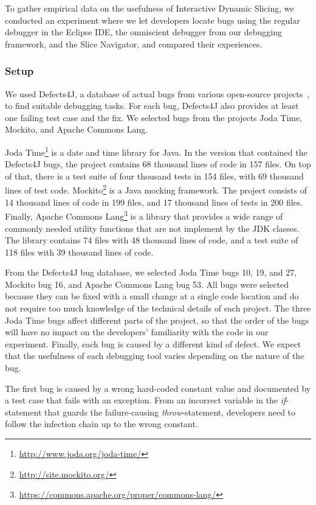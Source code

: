 \documentclass[
			english,
			]{elsarticle}
\begin{document}
To gather empirical data on the usefulness of Interactive Dynamic Slicing, we conducted an experiment where we let developers locate bugs using the regular debugger in the Eclipse IDE, the omniscient debugger from our debugging framework, and the Slice Navigator, and compared their experiences.

\subsubsection{Setup}

We used Defects4J, a database of actual bugs from various open-source projects~\cite{just_defects4j_2014}, to find suitable debugging tasks.
For each bug, Defects4J also provides at least one failing test case and the fix.
We selected bugs from the projects Joda Time, Mockito, and Apache Commons Lang.

Joda Time\footnote{\url{http://www.joda.org/joda-time/}} is a date and time library for Java.
In the version that contained the Defects4J bugs, the project contains 68 thousand lines of code in 157 files.
On top of that, there is a test suite of four thousand tests in 154 files, with 69 thousand lines of test code.
Mockito\footnote{\url{http://site.mockito.org/}} is a Java mocking framework.
The project consists of 14 thousand lines of code in 199 files, and 17 thousand lines of tests in 200 files.
Finally, Apache Commons Lang\footnote{\url{https://commons.apache.org/proper/commons-lang/}} is a library that provides a wide range of commonly needed utility functions that are not implement by the JDK classes.
The library contains 74 files with 48 thousand lines of code, and a test suite of 118 files with 39 thousand lines of code.



From the Defects4J bug database, we selected Joda Time bugs 10, 19, and 27, Mockito bug 16, and Apache Commons Lang bug 53.
All bugs were selected because they can be fixed with a small change at a single code location and do not require too much knowledge of the technical details of each project.
The three Joda Time bugs affect different parts of the project, so that the order of the bugs will have no impact on the developers' familiarity with the code in our experiment.
Finally, each bug is caused by a different kind of defect.
We expect that the usefulness of each debugging tool varies depending on the nature of the bug.

The first bug is caused by a wrong hard-coded constant value and documented by a test case that fails with an exception.
From an incorrect variable in the \emph{if}-statement that guards the failure-causing \emph{throw}-statement, developers need to follow the infection chain up to the wrong constant.
\end{document}
